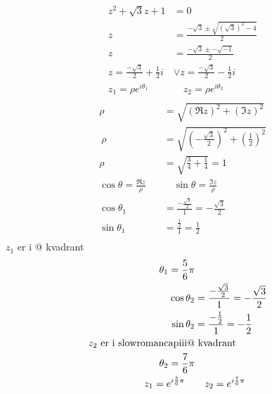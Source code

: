 \documentclass[defaultpackages]{cheatsheet}
\makeatletter
\newcommand*{\rom}[1]{\expandafter\@slowromancap\romannumeral #1@}
\makeatother
\begin{document}
	\subsubsection{}
	\begin{align*}
		z^2+\sqrt{3}z+1&=0\\
		z&=\frac{-\sqrt{3} \pm \sqrt{(\sqrt{3})^2 - 4}}{2}\\
		z&=\frac{-\sqrt{3} \pm -\sqrt{-1}}{2}\\
		z = \frac{-\sqrt{3}}{2} + \frac{1}{2}i &\vee z = \frac{-\sqrt{3}}{2} - \frac{1}{2} i\\
		z_1 = \rho e ^ {i\theta_1}\quad&\quad z_2 = \rho e ^ {i\theta_2}\\
	\end{align*}
	\begin{align*}
		\rho &= \sqrt{(\Re z)^2 + (\Im z)^2}\\\
		\rho &= \sqrt{\left(-\frac{\sqrt{3}}{2}\right)^2\!\!+\!\left(\frac{1}{2}\right)^2}\\
		\rho &= \sqrt{\frac{3}{4} + \frac{1}{4}} = 1\\
		\cos \theta = \frac{\Re z}{\rho} \quad & \quad \sin \theta = \frac{\Im z}{\rho}\\
		\cos \theta_1 &= \frac{-\frac{\sqrt{3}}{2}}{1} = -\frac{\sqrt{3}}{2}\\
		\sin \theta_1 &= \frac{\frac{1}{2}}{1} = \frac{1}{2}\\
	\end{align*}
	\(z_1\) er i \rom{2} kvadrant
	\begin{align*}
		\theta_1 = \frac{5}{6}\pi\\
		\cos \theta_2 &= \frac{-\frac{\sqrt{3}}{2}}{1} = -\frac{\sqrt{3}}{2}\\
		\sin \theta_2 &= \frac{-\frac{1}{2}}{1} = -\frac{1}{2}\\
		z_2 \text{ er i \rom{3}}&\text{ kvadrant}\\
		\theta_2 = \frac{7}{6}\pi\\
		z_1 = e^{i\frac{5}{6}\pi}\quad&\quad z_2=e^{i\frac{7}{6}\pi}\\
	\end{align*}
\end{document}
